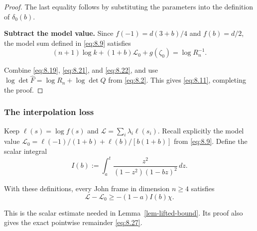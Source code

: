 \begin{proof}
The last equality follows by substituting the parameters into the definition
of $\delta_0(b)$.

\textbf{Subtract the model value.} Since $f(-1)=d(3+b)/4$ and $f(b)=d/2$,
the model sum defined in \eqref{eq:8.9} satisfies
\begin{equation}\label{eq:8.22}
(n+1)\log k+(1+b)\mathcal L_0+g(\zeta_0)=\log R_n^{-1}.
\end{equation}

Combine \eqref{eq:8.19}, \eqref{eq:8.21}, and \eqref{eq:8.22}, and use
$\log\det\widehat F=\log R_n+\log\det Q$ from \eqref{eq:8.2}.
This gives \eqref{eq:8.11}, completing the proof. 
\end{proof}


\subsubsection{The interpolation loss}\label{sec:8.2.2}

Keep $\ell(s)=\log f(s)$ and $\mathcal L=\sum_i\lambda_i\ell(s_i)$.
Recall explicitly the model value
$\mathcal L_0=\ell(-1)/(1+b)+\ell(b)/[b(1+b)]$ from \eqref{eq:8.9}.
Define the scalar integral
\begin{equation}\label{eq:8.23}
I(b):=\int_a^t\frac{z^2}{(1-z^2)(1-bz)^2}\,dz.
\end{equation}

\begin{lemma}\label{lem-hermite}
With these definitions, every John frame
in dimension $n\ge4$ satisfies
\begin{equation}\label{eq:8.24}
\mathcal L-\mathcal L_0\ge-(1-a)I(b)\chi.
\end{equation}

\end{lemma}

This is the scalar estimate needed in Lemma~\ref{lem-lifted-bound}. Its proof also gives the
exact pointwise remainder \eqref{eq:8.27}.

